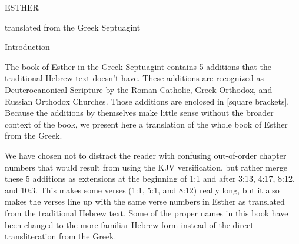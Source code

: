 ﻿\NormalFont{}
{\MT ESTHER
\par }{\MTB translated from the Greek Septuagint
\par }{\IS Introduction
\par }{\IP The book of Esther in the Greek Septuagint contains 5 additions that the traditional Hebrew text doesn’t have. These additions are recognized as Deuterocanonical Scripture by the Roman Catholic, Greek Orthodox, and Russian Orthodox Churches. Those additions are enclosed in [square brackets]. Because the additions by themselves make little sense without the broader context of the book, we present here a translation of the whole book of Esther from the Greek.
\par }{\IP We have chosen not to distract the reader with confusing out-of-order chapter numbers that would result from using the KJV versification, but rather merge these 5 additions as extensions at the beginning of 1:1 and after 3:13, 4:17, 8:12, and 10:3. This makes some verses (1:1, 5:1, and 8:12) really long, but it also makes the verses line up with the same verse numbers in Esther as translated from the traditional Hebrew text. Some of the proper names in this book have been changed to the more familiar Hebrew form instead of the direct transliteration from the Greek.

}
